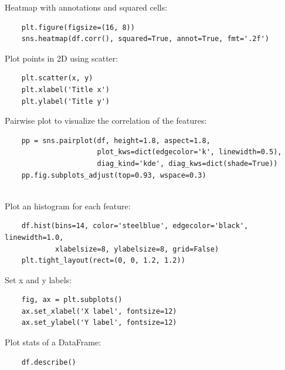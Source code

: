 \documentclass[12pt]{report}
\begin{document}
        Heatmap with annotations and squared cells:
        \begin{verbatim}
    plt.figure(figsize=(16, 8))
    sns.heatmap(df.corr(), squared=True, annot=True, fmt='.2f')
        \end{verbatim}
        
        Plot points in 2D using scatter:
        \begin{verbatim}
    plt.scatter(x, y)
    plt.xlabel('Title x')
    plt.ylabel('Title y')
        \end{verbatim}
        
        Pairwise plot to visualize the correlation of the features:
        \begin{verbatim}
    pp = sns.pairplot(df, height=1.8, aspect=1.8,
                      plot_kws=dict(edgecolor='k', linewidth=0.5),
                      diag_kind='kde', diag_kws=dict(shade=True))
    pp.fig.subplots_adjust(top=0.93, wspace=0.3)
    
        \end{verbatim}
        
        Plot an histogram for each feature:
        \begin{verbatim}
    df.hist(bins=14, color='steelblue', edgecolor='black', linewidth=1.0,
            xlabelsize=8, ylabelsize=8, grid=False)
    plt.tight_layout(rect=(0, 0, 1.2, 1.2))
        \end{verbatim}
        
        Set x and y labels:
        
        \begin{verbatim}
    fig, ax = plt.subplots()
    ax.set_xlabel('X label', fontsize=12)
    ax.set_ylabel('Y label', fontsize=12)
        \end{verbatim}
        
        Plot stats of a DataFrame:
        \begin{verbatim}
    df.describe()
        \end{verbatim}
        
\end{document}
